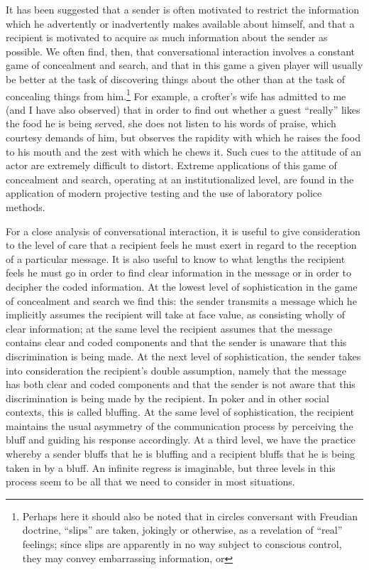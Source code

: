 \documentclass[twoside,symmetric,nobib,justified]{tufte-book}
\begin{document}
It has been suggested that a sender is often motivated to restrict the
information which he advertently or inadvertently makes available about
himself, and that a recipient is motivated to acquire as much
information about the sender as possible. We often find, then, that
conversational interaction involves a constant game of concealment and
search, and that in this game a given player will usually be better at
the task of discovering things about the other than at the task of
concealing things from him.\footnote{Perhaps here it should also be
  noted that in circles conversant with Freudian doctrine, ``slips'' are
  taken, jokingly or otherwise, as a revelation of ``real'' feelings;
  since slips are apparently in no way subject to conscious control,
  they may con­vey embarrassing information, or}
For example, a crofter's wife has admitted to me (and I have also
observed) that in order to find out whether a guest ``really'' likes the
food he is being served, she does not listen to his words of praise,
which courtesy demands of him, but observes the rapidity with which he
raises the food to his mouth and the zest with which he chews it. Such
cues to the attitude of an actor are extremely difficult to distort.
Extreme applications of this game of concealment and search, operating
at an institutionalized level, are found in the application of modern
projective testing and the use of laboratory police methods.

For a close analysis of conversational interaction, it is useful to give
consideration to the level of care that a re­cipient feels he must exert
in regard to the reception of a par­ticular message. It is also useful to
know to what lengths the recipient feels he must go in order to find
clear information in the message or in order to decipher the coded
information. At the lowest level of sophistication in the game of
concealment and search we find this: the sender transmits a message
which he implicitly assumes the recipient will take at face value, as
consisting wholly of clear information; at the same level the recipient
assumes that the message contains clear and coded com­ponents and that
the sender is unaware that this discrimination is being made. At the
next level of sophistication, the sender takes into consideration the
recipient's double assumption, namely that the message has both clear
and coded components and that the sender is not aware that this
discrimination is being made by the recipient. In poker and in other
social contexts, this is called bluffing. At the same level of
sophistication, the re­cipient maintains the usual asymmetry of the
communication proc­ess by perceiving the bluff and guiding his response
accordingly. At a third level, we have the practice whereby a sender
bluffs that he is bluffing and a recipient bluffs that he is being taken
in by a bluff. An infinite regress is imaginable, but three levels in
this process seem to be all that we need to con­sider in most situations.
\end{document}

